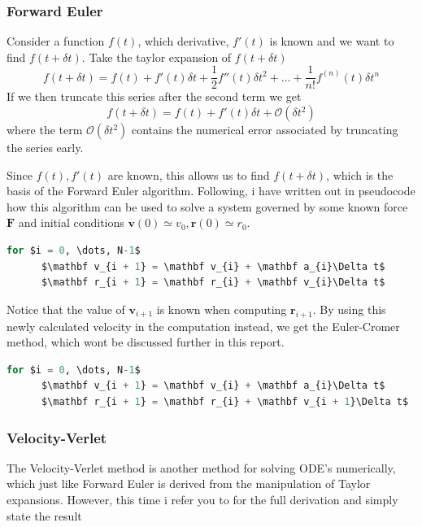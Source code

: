 \documentclass[10pt,showpacs,preprintnumbers,amsmath,amssymb,nofootinbib,aps,prl,twocolumn,groupedaddress,superscriptaddress,showkeys]{revtex4-1}
\begin{document}
  \subsubsection{Forward Euler}
    Consider a function $f(t)$, which derivative, $f'(t)$ is known and we want to find $f(t + \delta t)$. 
    Take the taylor expansion of $f(t + \delta t)$
    \begin{equation}
      f(t + \delta t) = f(t) + f'(t)\delta t + \frac{1}{2}f''(t)\delta t^2 + \dots + \frac{1}{n!}f^{(n)}(t)\delta t^n
    \end{equation}
    If we then truncate this series after the second term we get
    \begin{equation}
      f(t + \delta t) = f(t) + f'(t)\delta t + \mathcal O(\delta t^2)
    \end{equation}
    where the term $\mathcal O(\delta t^2)$ contains the numerical error associated by truncating the series early.

    Since $f(t), f'(t)$ are known, this allows us to find $f(t + \delta t)$, which is the basis of the Forward Euler algorithm. Following, i have written out in pseudocode how this algorithm can be used to solve a system governed by some known force $\mathbf F$ and initial conditions $\mathbf v(0) \simeq v_0, \mathbf r(0) \simeq r_0$.

    \begin{lstlisting}[mathescape=true, language=python, title=Forward Euler Algorithm (4N FLOPS)]
  for $i = 0, \dots, N-1$
      $\mathbf v_{i + 1} = \mathbf v_{i} + \mathbf a_{i}\Delta t$
      $\mathbf r_{i + 1} = \mathbf r_{i} + \mathbf v_{i}\Delta t$
  \end{lstlisting}

  Notice that the value of $\mathbf v_{i+1}$ is known when computing $\mathbf r_{i+1}$. By using this newly calculated velocity in the computation instead, we get the Euler-Cromer method, which wont be discussed further in this report.

  \begin{lstlisting}[mathescape=true, language=python, title=Euler-Cromer Algorithm (4N FLOPS)]
  for $i = 0, \dots, N-1$
      $\mathbf v_{i + 1} = \mathbf v_{i} + \mathbf a_{i}\Delta t$
      $\mathbf r_{i + 1} = \mathbf r_{i} + \mathbf v_{i + 1}\Delta t$
  \end{lstlisting}

  \subsubsection{Velocity-Verlet}
    The Velocity-Verlet method is another method for solving ODE's numerically, which just like Forward Euler is derived from the manipulation of Taylor expansions. However, this time i refer you to \cite{ode_lecture} for the full derivation and simply state the result
\end{document}
